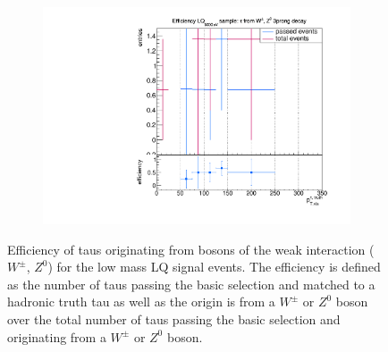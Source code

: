 \begin{figure}
\begin{subfigure}[t]{0.49\textwidth}
                \label{Dividedprompt:signal:1prongLQ75}
                \end{subfigure}
                \begin{subfigure}[t]{0.49\textwidth}
                \includegraphics[width=\textwidth]{figures/plots/LQ75/Divided_prompt3prong.pdf}
                \label{Dividedprompt:signal:3prongLQ75}
                \end{subfigure}
\caption[Efficiency of taus originating from bosons of the weak interaction ($W^\pm$, $Z^0$) for the low mass LQ signal events.]{Efficiency of taus originating from bosons of the weak interaction ($W^\pm$, $Z^0$) for the low mass LQ signal events. The efficiency is defined as the number of taus passing the basic selection and matched to a hadronic truth tau as well as the origin is from a $W^\pm$ or $Z^0$ boson over the total number of taus passing the basic selection and originating from a $W^\pm$ or $Z^0$ boson.}
\label{Dividedprompt:signal:LQ75}
\end{figure}


